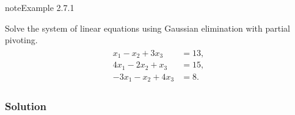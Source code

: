 \documentclass[letterpaper,10pt,english]{jupyterBook}
\begin{document}
\label{_pages/2.4_Partial_pivoting:partial-pivoting-example}
\begin{sphinxadmonition}{note}{Example 2.7.1}



\sphinxAtStartPar
Solve the system of linear equations using Gaussian elimination with partial pivoting.
\begin{equation*}
\begin{split} \begin{align*}
   x_1 - x_2 + 3x_3 &= 13, \\
   4x_1 - 2x_2 + x_3 &= 15, \\
   -3x_1 - x_2 + 4x_3 &= 8.
\end{align*} \end{split}
\end{equation*}\subsubsection*{Solution}


\end{sphinxadmonition}
\end{document}
